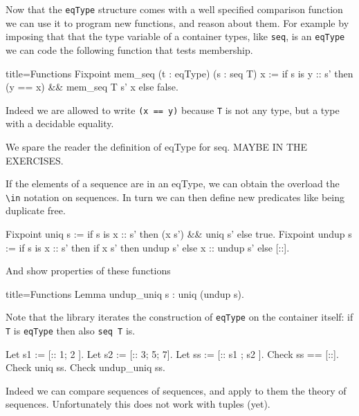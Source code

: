Now that the \lstinline/eqType/ structure comes with a well
specified comparison function we can use it to program new
functions, and reason about them.  For example by imposing
that that the type variable of a container types, like \lstinline/seq/,
is an \lstinline/eqType/ we can code the following function
that tests membership.

\begin{coq}{title=Functions}
Fixpoint mem_seq (t : eqType) (s : seq T) x :=
  if s is y :: s' then (y == x) && mem_seq T s' x else false.
\end{coq}

Indeed we are allowed to write \lstinline/(x == y)/ because
\lstinline/T/ is not any type, but a type with a decidable
equality.

We spare the reader the definition of eqType for seq.
MAYBE IN THE EXERCISES.

If the elements of a sequence are in an eqType, we can obtain
the overload the \lstinline/\in/ notation on sequences.
In turn we can then define new predicates like being duplicate free.

\begin{coq}{}
Fixpoint uniq s :=
  if s is x :: s' then (x \notin s') && uniq s' else true.
Fixpoint undup s :=
  if s is x :: s' then
    if x \in s' then undup s' else x :: undup s'
  else [::].
\end{coq}

And show properties of these functions

\begin{coq}{title=Functions}
Lemma undup_uniq s : uniq (undup s).
\end{coq}


Note that the \mcbMC{} library iterates the construction of
\lstinline/eqType/ on the container itself:
if \lstinline/T/ is \lstinline/eqType/ then also \lstinline/seq T/ is.

\begin{coq}{}
Let s1 := [:: 1; 2 ].
Let s2 := [:: 3; 5; 7].
Let ss := [:: s1 ; s2 ].
Check ss == [::].
Check uniq ss.
Check undup_uniq ss.
\end{coq}

Indeed we can compare sequences of sequences, and apply to them
the theory of sequences.
Unfortunately this does not work with tuples (yet).

